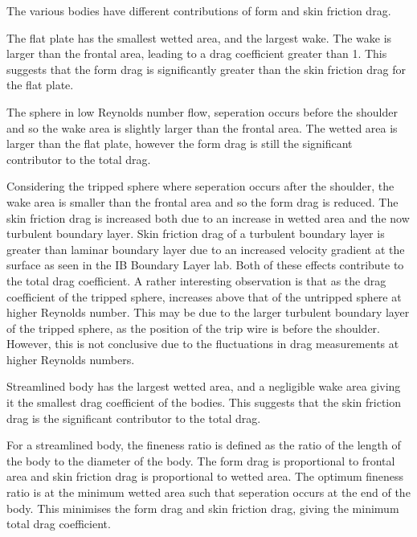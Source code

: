 \documentclass[8pt]{article}
\begin{document}


The various bodies have different contributions of form and skin friction drag.

The flat plate has the smallest wetted area, and the largest wake. The wake is larger than the frontal area, leading to a drag coefficient greater than 1.
This suggests that the form drag is significantly greater than the skin friction drag for the flat plate.

The sphere in low Reynolds number flow, seperation occurs before the shoulder and so the wake area is slightly larger than the frontal area.
The wetted area is larger than the flat plate, however the form drag is still the significant contributor to the total drag.

Considering the tripped sphere where seperation occurs after the shoulder, the wake area is smaller than the frontal area and so the form drag is reduced.
The skin friction drag is increased both due to an increase in wetted area and the now turbulent boundary layer.
Skin friction drag of a turbulent boundary layer is greater than laminar boundary layer due to an increased velocity gradient at the surface as seen in the IB Boundary Layer lab.
Both of these effects contribute to the total drag coefficient.
A rather interesting observation is that as the drag coefficient of the tripped sphere, increases above that of the untripped sphere at higher Reynolds number.
This may be due to the larger turbulent boundary layer of the tripped sphere, as the position of the trip wire is before the shoulder.
However, this is not conclusive due to the fluctuations in drag measurements at higher Reynolds numbers.

Streamlined body has the largest wetted area, and a negligible wake area giving it the smallest drag coefficient of the bodies. 
This suggests that the skin friction drag is the significant contributor to the total drag.


For a streamlined body, the fineness ratio is defined as the ratio of the length of the body to the diameter of the body.
The form drag is proportional to frontal area and skin friction drag is proportional to wetted area.
The optimum fineness ratio is at the minimum wetted area such that seperation occurs at the end of the body.
This minimises the form drag and skin friction drag, giving the minimum total drag coefficient.
\end{document}
